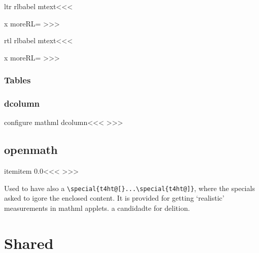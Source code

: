 {{{{{{\<ltr rlbabel mtext\><<<
\ifmtext
    \leavevmode{}x%
    \def\end:moreRL{\HCode{</\a:mathml mtext><\a:mathml mtext>}}%
\else
   \let\end:moreRL=\empty
\fi
>>>



\<rtl rlbabel mtext\><<<
\ifmtext
    \leavevmode{}x%
    \def\end:moreRL{\HCode{</\a:mathml mtext><\a:mathml mtext>}}%
\else
    \let\end:moreRL=\empty
\fi
>>>


\subsection{Tables}


\subsection{dcolumn}


\<configure mathml dcolumn\><<<
  {\NoFonts\Configure{$}{}{}{}} 
  {\EndNoFonts} 
>>>




\section{openmath}
  

\<itemitem 0.0\><<<
>>>

  


Used to have also a \verb'\special{t4ht@[}...\special{t4ht@]}',
where the specials asked to igore the enclosed
content. It is provided for getting `realistic' measurements in mathml
applets. a candidadte for delition.









\chapter{Shared}


}}}}}}
